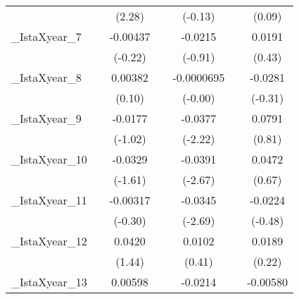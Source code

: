 {\begin{tabular}{l*{6}{c}}
            &                     &      (2.28)         &                     &     (-0.13)         &                     &      (0.09)         \\
[1em]
\_IstaXyear\_7&                     &    -0.00437         &                     &     -0.0215         &                     &      0.0191         \\
            &                     &     (-0.22)         &                     &     (-0.91)         &                     &      (0.43)         \\
[1em]
\_IstaXyear\_8&                     &     0.00382         &                     &  -0.0000695         &                     &     -0.0281         \\
            &                     &      (0.10)         &                     &     (-0.00)         &                     &     (-0.31)         \\
[1em]
\_IstaXyear\_9&                     &     -0.0177         &                     &     -0.0377\sym{*}  &                     &      0.0791         \\
            &                     &     (-1.02)         &                     &     (-2.22)         &                     &      (0.81)         \\
[1em]
\_IstaXyear\_10&                     &     -0.0329         &                     &     -0.0391\sym{*}  &                     &      0.0472         \\
            &                     &     (-1.61)         &                     &     (-2.67)         &                     &      (0.67)         \\
[1em]
\_IstaXyear\_11&                     &    -0.00317         &                     &     -0.0345\sym{*}  &                     &     -0.0224         \\
            &                     &     (-0.30)         &                     &     (-2.69)         &                     &     (-0.48)         \\
[1em]
\_IstaXyear\_12&                     &      0.0420         &                     &      0.0102         &                     &      0.0189         \\
            &                     &      (1.44)         &                     &      (0.41)         &                     &      (0.22)         \\
[1em]
\_IstaXyear\_13&                     &     0.00598         &                     &     -0.0214         &                     &    -0.00580         \\

\end{tabular}}
